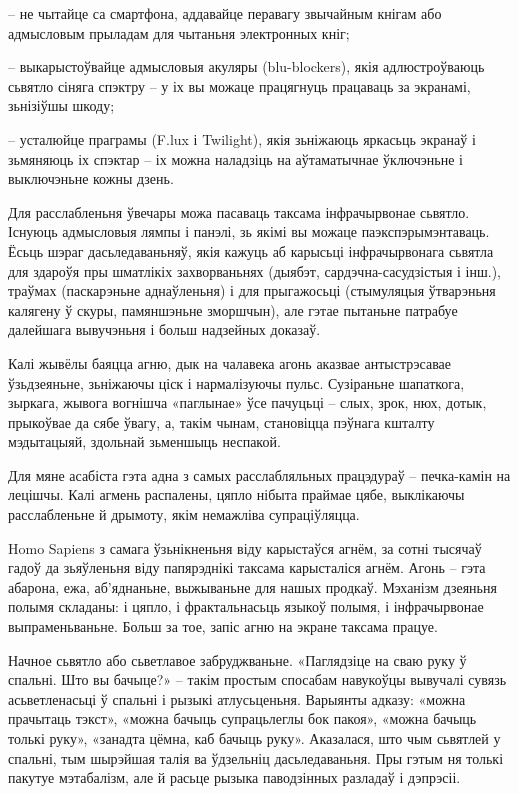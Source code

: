 – не чытайце са смартфона, аддавайце перавагу звычайным кнігам або адмысловым прыладам для чытаньня электронных кніг;

– выкарыстоўвайце адмысловыя акуляры (blu-blockers), якія адлюстроўваюць сьвятло сіняга спэктру – у іх вы можаце працягнуць працаваць за экранамі, зьнізіўшы шкоду;

– усталюйце праграмы (F.lux і Twilight), якія зьніжаюць яркасьць экранаў і зьмяняюць іх спэктар – іх можна наладзіць на аўтаматычнае ўключэньне і выключэньне кожны дзень.

Для расслабленьня ўвечары можа пасаваць таксама інфрачырвонае сьвятло. Існуюць адмысловыя лямпы і панэлі, зь якімі вы можаце паэкспэрымэнтаваць. Ёсьць шэраг дасьледаваньняў, якія кажуць аб карысьці інфрачырвонага сьвятла для здароўя пры шматлікіх захворваньнях (дыябэт, сардэчна-сасудзістыя і інш.), траўмах (паскарэньне аднаўленьня) і для прыгажосьці (стымуляцыя ўтварэньня калягену ў скуры, памяншэньне зморшчын), але гэтае пытаньне патрабуе далейшага вывучэньня і больш надзейных доказаў. 

Калі жывёлы баяцца агню, дык на чалавека агонь аказвае антыстрэсавае ўзьдзеяньне, зьніжаючы ціск і нармалізуючы пульс. Сузіраньне шапаткога, зыркага, жывога вогнішча «паглынае» ўсе пачуцьці – слых, зрок, нюх, дотык, прыкоўвае да сябе ўвагу, а, такім чынам, становіцца пэўнага кшталту мэдытацыяй, здольнай зьменшыць неспакой.

Для мяне асабіста гэта адна з самых расслабляльных працэдураў – печка-камін на лецішчы. Калі агмень распалены, цяпло нібыта праймае цябе, выклікаючы расслабленьне й дрымоту, якім немажліва супраціўляцца.

Homo Sapiens з самага ўзьнікненьня віду карыстаўся агнём, за сотні тысячаў гадоў да зьяўленьня віду папярэднікі таксама карысталіся агнём. Агонь – гэта абарона, ежа, аб'яднаньне, выжываньне для нашых продкаў. Мэханізм дзеяньня полымя складаны: і цяпло, і фрактальнасьць языкоў полымя, і інфрачырвонае выпраменьваньне. Больш за тое, запіс агню на экране таксама працуе.

Начное сьвятло або сьветлавое забруджваньне. «Паглядзіце на сваю руку ў спальні. Што вы бачыце?» – такім простым спосабам навукоўцы вывучалі сувязь асьветленасьці ў спальні і рызыкі атлусьценьня. Варыянты адказу: «можна прачытаць тэкст», «можна бачыць супрацьлеглы бок пакоя», «можна бачыць толькі руку», «занадта цёмна, каб бачыць руку». Аказалася, што чым сьвятлей у спальні, тым шырэйшая талія ва ўдзельніц дасьледаваньня. Пры гэтым ня толькі пакутуе мэтабалізм, але й расьце рызыка паводзінных разладаў і дэпрэсіі.

